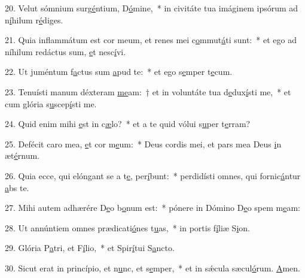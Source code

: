 20. Velut sómnium surg\uline{é}ntium, D\uline{ó}mine,~* in civitáte tua imáginem ipsórum ad n\uline{í}hilum r\uline{é}diges.\par 
21. Quia inflammátum est cor meum, et renes mei c\uline{o}mmut\uline{á}ti sunt:~* et ego ad níhilum redáctus sum, \uline{e}t nesc\uline{í}vi.\par 
22. Ut juméntum f\uline{a}ctus sum \uline{a}pud te:~* et ego s\uline{e}mper t\uline{e}cum.\par 
23. Tenuísti manum déxteram \uline{me}am:~† et in voluntáte tua d\uline{e}dux\uline{í}sti me,~* et cum glória s\uline{u}scep\uline{í}sti me.\par 
24. Quid enim mihi \uline{e}st in c\uline{æ}lo?~* et a te quid vólui s\uline{u}per t\uline{e}rram?\par 
25. Defécit caro mea, \uline{e}t cor m\uline{e}um:~* Deus cordis mei, et pars mea Deus \uline{i}n æt\uline{é}rnum.\par 
26. Quia ecce, qui elóngant se a t\uline{e}, per\uline{í}bunt:~* perdidísti omnes, qui fornic\uline{á}ntur \uline{a}bs te.\par 
27. Mihi autem adhærére D\uline{e}o b\uline{o}num est:~* pónere in Dómino D\uline{e}o spem m\uline{e}am:\par 
28. Ut annúntiem omnes prædicati\uline{ó}nes t\uline{u}as,~* in portis f\uline{í}liæ S\uline{i}on.\par 
29. Glória P\uline{a}tri, et F\uline{í}lio,~* et Spir\uline{í}tui S\uline{a}ncto.\par 
30. Sicut erat in princípio, et n\uline{u}nc, et s\uline{e}mper,~* et in sǽcula sæcul\uline{ó}rum. \uline{A}men.\par 
